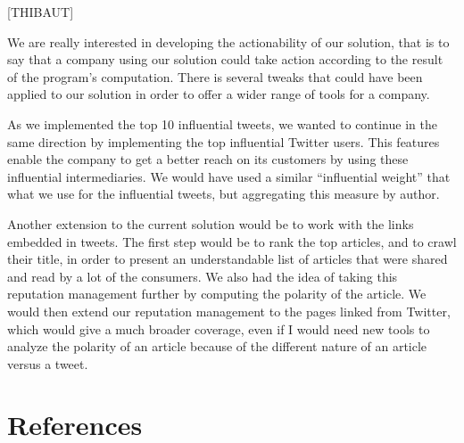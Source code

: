 \documentclass[a4paper,12pt]{report}
\begin{document}
[THIBAUT]

We are really interested in developing the actionability of our solution, that is to say that a company using our solution could take action according to the result of the program’s computation. There is several tweaks that could have been applied to our solution in order to offer a wider range of tools for a company.

As we implemented the top 10 influential tweets, we wanted to continue in the same direction by implementing the top influential Twitter users. This features enable the company to get a better reach on its customers by using these influential intermediaries. We would have used a similar “influential weight” that what we use for the influential tweets, but aggregating this measure by author.

Another extension to the current solution would be to work with the links embedded in tweets. The first step would be to rank the top articles, and to crawl their title, in order to present an understandable list of articles that were shared and read by a lot of the consumers. We also had the idea of taking this reputation management further by computing the polarity of the article. We would then extend our reputation management to the pages linked from Twitter, which would give a much broader coverage, even if I would need new tools to analyze the polarity of an article because of the different nature of an article versus a tweet.

\chapter{References}
\end{document}

